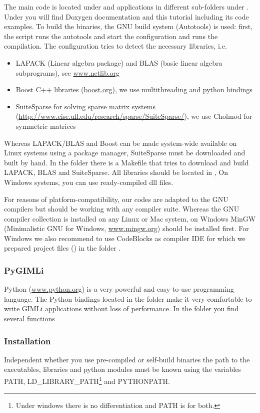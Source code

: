 The main code is located under  and applications in different sub-folders under .
Under  you will find Doxygen documentation and this tutorial including its code examples.
To build the binaries, the GNU build system (Autotools) is used: first, the script  runs the autotools and start the configuration  and  runs the compilation.
The configuration tries to detect the necessary libraries, i.e. 
\begin{itemize}
	\item LAPACK (Linear algebra package) and BLAS (basic linear algebra subprograms), see \url{www.netlib.org}
	\item Boost C++ libraries (\url{boost.org}), we use multithreading and python bindings 
	\item SuiteSparse for solving sparse matrix systems (\url{http://www.cise.ufl.edu/research/sparse/SuiteSparse/}), we use Cholmod for symmetric matrices
\end{itemize}
Whereas LAPACK/BLAS and Boost can be made system-wide available on Linux systems using a package manager, SuiteSparse must be downloaded and built by hand. 
In the folder  there is a Makefile that tries to download and build LAPACK, BLAS and SuiteSparse.
All libraries should be located in , 
On Windows systems, you can use ready-compiled dll files.

For reasons of platform-compatibility, our codes are adapted to the GNU compilers but should be working with any compiler suite.
Whereas the GNU compiler collection is installed on any Linux or Mac system, on Windows MinGW (Minimalistic GNU for Windows, \url{www.mingw.org}) should be installed first.
For Windows we also recommend to use CodeBlocks as compiler IDE for which we prepared project files () in the folder .

\subsubsection*{PyGIMLi}
Python (\url{www.python.org}) is a very powerful and easy-to-use programming language.
The Python bindings located in the folder  make it very comfortable to write GIMLi applications without loss of performance.
In the folder  you find several functions

\subsubsection*{Installation}
Independent whether you use pre-compiled or self-build binaries the path to the executables, libraries and python modules must be known using the variables PATH, LD\_LIBRARY\_PATH\footnote{Under windows there is no differentiation and PATH is for both.} and PYTHONPATH.

